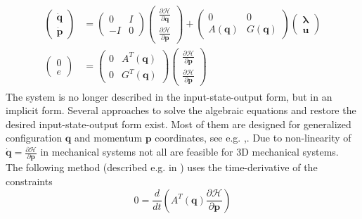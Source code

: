 \documentclass[a4paper,twoside, openright,12pt]{report}
\newcommand{\f}[1]{\boldsymbol{#1}}
\begin{document}
{\begin{eqnarray}\label{EQ:PHSpconstrained}
\begin{aligned}
\begin{pmatrix}
\dot{\f{q}} \\ \dot{\f{p}} \end{pmatrix} &= 
\begin{pmatrix} 0 & I \\ -I & 0\end{pmatrix}
\begin{pmatrix}
\frac{\partial \mathcal{H}}{\partial \f{q}} \\ \frac{\partial \mathcal{H}}{\partial \f{p}}\end{pmatrix}
+ \begin{pmatrix}0 & 0 \\ A(\f{q}) & G(\f{q})\end{pmatrix}
\begin{pmatrix}\boldsymbol{\lambda} \\ \f{u}\end{pmatrix}
\\
\begin{pmatrix}0 \\ e\end{pmatrix} &=
\begin{pmatrix}0 & A^T(\f{q}) \\ 0 & G^T(\f{q})\end{pmatrix}
\begin{pmatrix}
\frac{\partial \mathcal{H}}{\partial \f{p}} \\ \frac{\partial \mathcal{H}}{\partial \f{p}}\end{pmatrix}
\end{aligned}
\end{eqnarray}
The system is no longer described in the input-state-output form, but in an implicit form. Several approaches to solve the algebraic equations and restore the desired input-state-output form exist. Most of them are designed for generalized configuration $\f{q}$ and momentum $\f{p}$ coordinates, see e.g. \cite{Schaft_13},\cite{Duindam_09}. Due to non-linearity of $\dot{\f{q}}=\frac{\partial \mathcal{H}}{\partial \f{p}}$ in mechanical systems not all are feasible for $3$D mechanical systems. \\
The following method (described e.g. in \cite{Duindam_09}) uses the time-derivative of the constraints
\begin{equation}\label{EQ:constraintderivative}
0 = \frac{d}{dt}\left(A^T(\f{q})\frac{\partial \mathcal{H}}{\partial \f{p}}\right)

\end{equation}}
\end{document}
